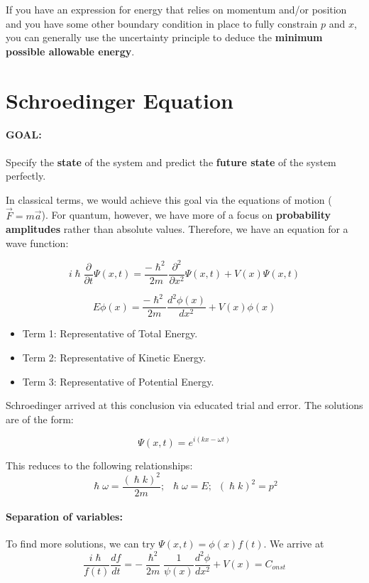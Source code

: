 \documentclass[a4paper,12pt]{report}
\begin{document}
If you have an expression for energy that relies on momentum and/or position and you have some other boundary condition in place to fully constrain $p$ and $x$, you can generally use the uncertainty principle to deduce the \textbf{minimum possible allowable energy}. 

\section{Schroedinger Equation}

\paragraph{GOAL: } Specify the \textbf{state} of the system and predict the \textbf{future state} of the system perfectly. 

In classical terms, we would achieve this goal via the equations of motion ($\vec{F} = m\vec{a}$). For quantum, however, we have more of a focus on \textbf{probability amplitudes} rather than absolute values. Therefore, we have an equation for a wave function:

$$i\hslash \frac{\partial}{\partial t} \Psi(x, t)  =   \frac{-\hslash^2}{2m} \frac{\partial^2}{\partial x^2} \Psi(x, t) + V(x) \Psi(x, t)$$

$$E\phi(x) = \frac{-\hslash^2}{2m} \frac{d^2\phi(x)}{dx^2} + V(x)\phi(x)$$ %

\begin{itemize}
\item Term 1: Representative of Total Energy.
\item Term 2: Representative of Kinetic Energy.
\item Term 3: Representative of Potential Energy.
\end{itemize}

Schroedinger arrived at this conclusion via educated trial and error. The solutions are of the form:

$$\Psi(x, t) = e^{i(kx-\omega t)}$$

This reduces to the following relationships:
$$\hslash \omega = \frac{( \hslash k )^2}{2m};\,\,\, \hslash \omega = E;\,\,\, (\hslash k)^2 = p^2$$

\paragraph{Separation of variables: } To find more solutions, we can try $\Psi(x, t) = \phi(x)f(t)$. We arrive at
$$\frac{i\hslash}{f(t)} \frac{df}{dt} = -\frac{\hslash^2}{2m}\frac{1}{\psi(x)}\frac{d^2\phi}{dx^2} + V(x) = C_{onst}$$
\end{document}
